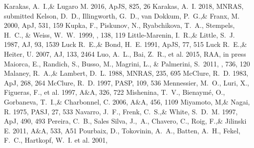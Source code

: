 \documentclass[a4paper,fleqn,usenatbib]{mnras}
\begin{document}
\begin{thebibliography}{99}
Karakas, A.~I.,\& Lugaro M. 2016, 
ApJS, 825, 26
Karakas, A.~I. 2018, 
MNRAS, submitted
Kelson, D.~D., Illingworth, G.~D., van Dokkum, P.~G.,\& Franx, M. 2000, ApJ, 531, 159
 Kupka, F., Piskunov, N., Ryabchikova, T.~A., Stempels, H.~C., \& Weiss, W.~W.\ 1999, \aaps, 138, 119 
Little-Marenin, I.~R.,\& Little, S.~J. 1987, 
AJ, 93, 1539
Luck R.~E.,\& Bond, H.~E. 1991, 
ApJS, 77, 515
Luck R.~E.,\& Heiter, U. 2007, 
AJ, 133, 2464
Luo, A.~L., Bai, Z.~R., et al. 2015, 
RAA, in press
 Maiorca, E., Randich, S., Busso, M., Magrini, L., \& Palmerini, S.\ 2011, \apj, 736, 120 
Malaney, R.~A.,\& Lambert, D.~L. 1988, 
MNRAS, 235, 695
McClure, R.~D. 1983, 
ApJ, 268, 264
McClure, R.~D. 1997, 
PASP, 109, 536
Mennessier, M.~O., Luri, X., Figueras, F., et al. 1997, 
A$\&$A, 326, 722
Mishenina, T.~V., Bienaym\' e, O., Gorbaneva, T.~I.,\& Charbonnel, C. 2006, 
A$\&$A, 456, 1109
Miyamoto, M,\& Nagai, R. 1975, 
PASJ, 27, 533
Navarro, J.~F., Frenk, C.~S.,\& White, S.~D.~M. 1997, 
ApJ, 490, 493
Pereira, C.~B., Sales Silva, J.,~A., Chavero, C., Roig, F.,\& Jilinski E. 2011, 
A$\&$A, 533, A51
Pourbaix, D., Tokovinin, A.~A., Batten, A.~H., Fekel, F.~C., Hartkopf, W.~I. et al. 2001, 

\end{thebibliography}
\end{document}
